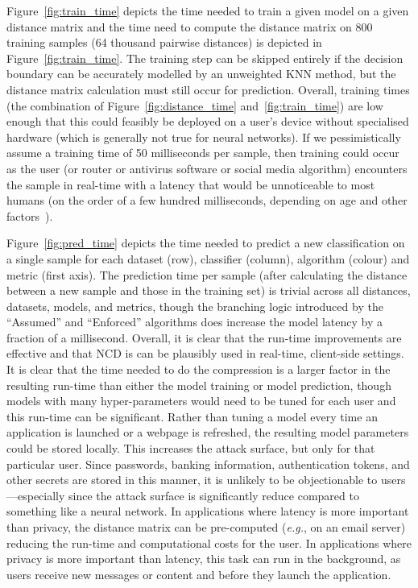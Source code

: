 \documentclass[preprint,12pt]{article}
\begin{document}
Figure~\ref{fig:train_time} depicts the time needed to train a given model on a given distance matrix and the time need to compute the distance matrix on 800 training samples (64 thousand pairwise distances) is depicted in Figure~\ref{fig:train_time}.
The training step can be skipped entirely if the decision boundary can be accurately modelled by an unweighted KNN method, but the distance matrix calculation must still occur for prediction.
Overall, training times (the combination of Figure~\ref{fig:distance_time} and~\ref{fig:train_time}) are low enough that this could feasibly be deployed on a user's device without specialised hardware (which is generally not true for neural networks).
If we pessimistically assume a training time of 50 milliseconds per sample, then training could occur as the user (or router or antivirus software or social media algorithm) encounters the sample in real-time with a latency that would be unnoticeable to most humans (on the order of a few hundred milliseconds, depending on age and other factors~\cite{reaction_time}).

Figure~\ref{fig:pred_time} depicts the time needed to predict a new classification on a single sample for each dataset (row), classifier (column), algorithm (colour) and metric (first axis).
The prediction time per sample (after calculating the distance between a new sample and those in the training set) is trivial across all distances, datasets, models, and metrics, though the branching logic introduced by the ``Assumed'' and ``Enforced'' algorithms does increase the model latency by a fraction of a millisecond.
Overall, it is clear that the run-time improvements are effective and that NCD is can be plausibly used in real-time, client-side settings.
It is clear that the time needed to do the compression is a larger factor in the resulting run-time than either the model training or model prediction, though models with many hyper-parameters would need to be tuned for each user and this run-time can be significant.
Rather than tuning a model every time an application is launched or a webpage is refreshed, the resulting model parameters could be stored locally.
This increases the attack surface, but only for that particular user.
Since passwords, banking information, authentication tokens, and other secrets are stored in this manner, it is unlikely to be objectionable to users---especially since the attack surface is significantly reduce compared to something like a neural network.
In applications where latency is more important than privacy, the distance matrix can be pre-computed (\textit{e.g.}, on an email server) reducing the run-time and computational costs for the user.
In applications where privacy is more important than latency, this task can run in the background, as users receive new messages or content and before they launch the application.
\end{document}
